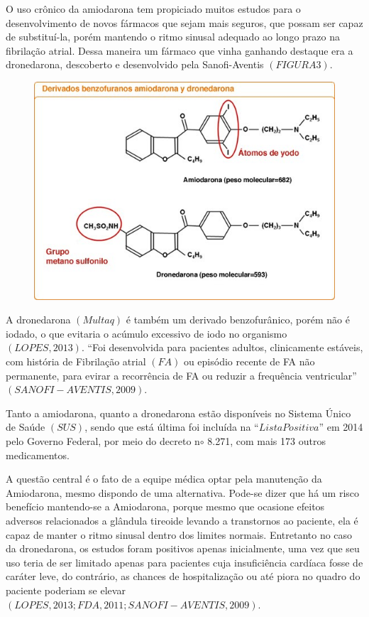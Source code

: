 \documentclass[svgnames,12pt,oneside, openright,a4paper]{scrbook}
\begin{document}
O uso crônico da amiodarona tem propiciado muitos estudos para o desenvolvimento de novos fármacos que sejam mais seguros, que possam ser capaz de substituí-la, porém mantendo o ritmo sinusal adequado ao longo prazo na fibrilação atrial. Dessa maneira um fármaco que vinha ganhando destaque era a dronedarona, descoberto e desenvolvido pela Sanofi-Aventis $(FIGURA 3)$.

\begin{figure}
\begin{center}

\includegraphics[scale=1]{molecula2.jpg}

\end{center}
\end{figure}

A dronedarona $(Multaq)$ é também um derivado benzofurânico, porém não é iodado, o que evitaria o acúmulo excessivo de iodo no organismo $(LOPES, 2013)$. $“$Foi desenvolvida para pacientes adultos, clinicamente estáveis, com história de Fibrilação atrial $(FA)$ ou episódio recente de FA não permanente, para evirar a recorrência de FA ou reduzir a frequência ventricular$”$ $(SANOFI-AVENTIS, 2009)$. 

Tanto a amiodarona, quanto a dronedarona estão disponíveis no Sistema Único de Saúde $(SUS)$, sendo que está última foi incluída na $“Lista Positiva”$ em 2014 pelo Governo Federal, por meio do decreto n$\circ$ 8.271, com mais 173 outros medicamentos. 

A questão central é o fato de a equipe médica optar pela manutenção da Amiodarona, mesmo dispondo de uma alternativa. Pode-se dizer que há um risco benefício mantendo-se a Amiodarona, porque mesmo que ocasione efeitos adversos relacionados a glândula tireoide levando a transtornos ao paciente, ela é capaz de manter o ritmo sinusal dentro dos limites normais. Entretanto no caso da dronedarona, os estudos foram positivos apenas inicialmente, uma vez que seu uso teria de ser limitado apenas para pacientes cuja insuficiência cardíaca fosse de caráter leve, do contrário, as chances de hospitalização ou até piora no quadro do paciente poderiam se elevar $(LOPES, 2013; FDA, 2011; SANOFI-AVENTIS, 2009)$.  
\end{document}
